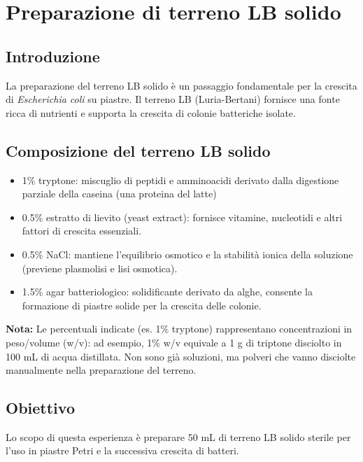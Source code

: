 \section{Preparazione di terreno LB solido}
\subsection{Introduzione}

La preparazione del terreno LB solido è un passaggio fondamentale per la crescita di \textit{Escherichia coli} su piastre. Il terreno LB (Luria-Bertani) fornisce una fonte ricca di nutrienti e supporta la crescita di colonie batteriche isolate.

\subsection{Composizione del terreno LB solido}

\begin{itemize}\footnotesize
    \item 1\% tryptone: miscuglio di peptidi e amminoacidi derivato dalla digestione parziale della caseina (una proteina del latte)
    \item 0.5\% estratto di lievito (yeast extract): fornisce vitamine, nucleotidi e altri fattori di crescita essenziali.
    \item 0.5\% NaCl: mantiene l’equilibrio osmotico e la stabilità ionica della soluzione (previene plasmolisi e lisi osmotica).
    \item 1.5\% agar batteriologico: solidificante derivato da alghe, consente la formazione di piastre solide per la crescita delle colonie.
\end{itemize}

\begin{notaBox}
  \textbf{Nota:} Le percentuali indicate (es. 1\% tryptone) rappresentano concentrazioni in peso/volume (w/v): ad esempio, 1\% w/v equivale a 1 g di triptone disciolto in 100 mL di acqua distillata. Non sono già soluzioni, ma polveri che vanno disciolte manualmente nella preparazione del terreno.
\end{notaBox}

\subsection{Obiettivo}

Lo scopo di questa esperienza è preparare 50 mL di terreno LB solido sterile per l’uso in piastre Petri e la successiva crescita di batteri.

